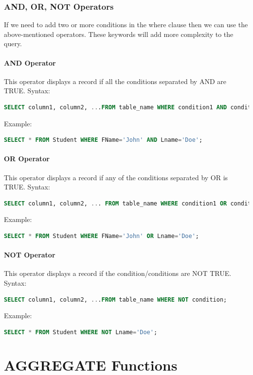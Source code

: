 \subsection{AND, OR, NOT Operators}
If we need to add two or more conditions in the where clause then we can use the above-mentioned operators. These keywords will add more complexity to the query.

\subsubsection{AND Operator}
This operator displays a record if all the conditions separated by AND are TRUE.
Syntax:
\begin{lstlisting}[language=sql]
	SELECT column1, column2, ...FROM table_name WHERE condition1 AND condition2 AND condition3 ...;
\end{lstlisting}
Example:
\begin{lstlisting}[language=sql]
	SELECT * FROM Student WHERE FName='John' AND Lname='Doe';
\end{lstlisting}

\subsubsection{OR Operator}
This operator displays a record if any of the conditions separated by OR is TRUE.
Syntax:
\begin{lstlisting}[language=sql]
	SELECT column1, column2, ... FROM table_name WHERE condition1 OR condition2 OR condition3 ...;
\end{lstlisting}
Example:
\begin{lstlisting}[language=sql]
	SELECT * FROM Student WHERE FName='John' OR Lname='Doe';
\end{lstlisting}

\subsubsection{NOT Operator}
This operator displays a record if the condition/conditions are NOT TRUE.
Syntax:
\begin{lstlisting}[language=sql]
	SELECT column1, column2, ...FROM table_name WHERE NOT condition;
\end{lstlisting}
Example:
\begin{lstlisting}[language=sql]
	SELECT * FROM Student WHERE NOT Lname='Doe';
\end{lstlisting}

\chapter{AGGREGATE Functions}
